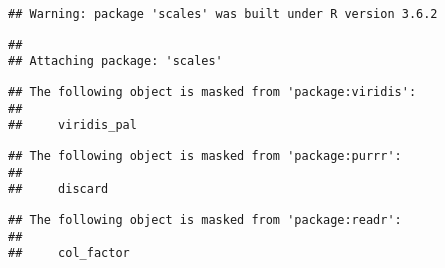 \documentclass[
]{article}
\newenvironment{Shaded}{\begin{snugshade}}{\end{snugshade}}
\newcommand{\DataTypeTok}[1]{\textcolor[rgb]{0.13,0.29,0.53}{#1}}
\newcommand{\DecValTok}[1]{\textcolor[rgb]{0.00,0.00,0.81}{#1}}
\newcommand{\KeywordTok}[1]{\textcolor[rgb]{0.13,0.29,0.53}{\textbf{#1}}}
\newcommand{\NormalTok}[1]{#1}
\newcommand{\OperatorTok}[1]{\textcolor[rgb]{0.81,0.36,0.00}{\textbf{#1}}}
\newcommand{\StringTok}[1]{\textcolor[rgb]{0.31,0.60,0.02}{#1}}
\begin{document}
\begin{Shaded}
\end{Shaded}

\begin{verbatim}
## Warning: package 'scales' was built under R version 3.6.2
\end{verbatim}

\begin{verbatim}
## 
## Attaching package: 'scales'
\end{verbatim}

\begin{verbatim}
## The following object is masked from 'package:viridis':
## 
##     viridis_pal
\end{verbatim}

\begin{verbatim}
## The following object is masked from 'package:purrr':
## 
##     discard
\end{verbatim}

\begin{verbatim}
## The following object is masked from 'package:readr':
## 
##     col_factor
\end{verbatim}
\end{document}
